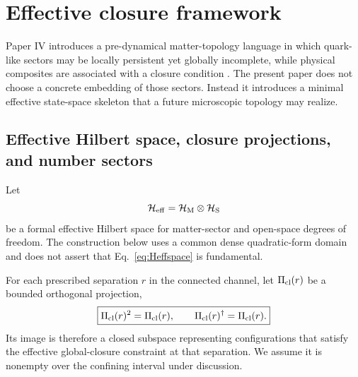 \documentclass[10pt]{article}
\begin{document}
\section{Effective closure framework}
\label{sec:opening}

Paper IV introduces a pre-dynamical matter-topology language in which quark-like sectors may be locally persistent yet globally incomplete, while physical composites are associated with a closure condition \cite{WuMatterSpace}. The present paper does not choose a concrete embedding of those sectors. Instead it introduces a minimal effective state-space skeleton that a future microscopic topology may realize.

\subsection{Effective Hilbert space, closure projections, and number sectors}

Let
\begin{equation}
\mathcal H_{\rm eff}=\mathcal H_{\rm M}\otimes\mathcal H_{\rm S}
\label{eq:Heffspace}
\end{equation}
be a formal effective Hilbert space for matter-sector and open-space degrees of freedom. The construction below uses a common dense quadratic-form domain and does not assert that Eq.~\eqref{eq:Heffspace} is fundamental.

For each prescribed separation $r$ in the connected channel, let $\Pi_{\rm cl}(r)$ be a bounded orthogonal projection,
\begin{equation}
\boxed{\Pi_{\rm cl}(r)^2=\Pi_{\rm cl}(r),\qquad
\Pi_{\rm cl}(r)^\dagger=\Pi_{\rm cl}(r).}
\label{eq:projector}
\end{equation}
Its image is therefore a closed subspace representing configurations that satisfy the effective global-closure constraint at that separation. We assume it is nonempty over the confining interval under discussion.
\end{document}
